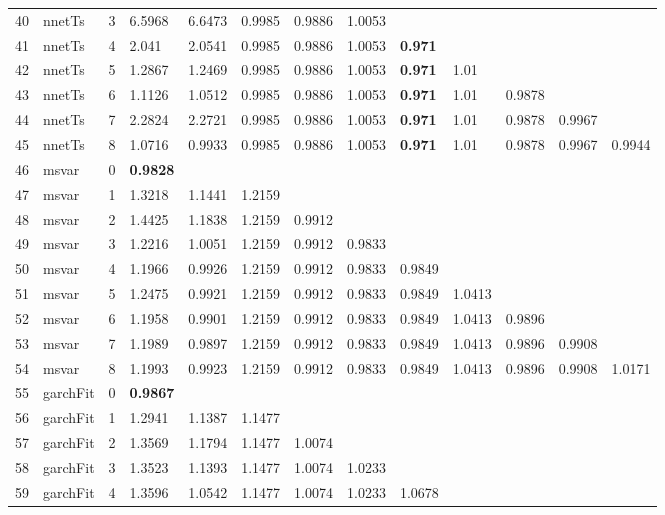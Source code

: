 \documentclass[10pt,a4paper]{article}
\begin{document}
\begin{table}[ht]
\begin{tabular}{rlrllllllllll}
  40 & nnetTs &     3 & 6.5968 & 6.6473 & 0.9985 & 0.9886 & 1.0053 &  &  &  &  &  \\ 
  41 & nnetTs &     4 & 2.041 & 2.0541 & 0.9985 & 0.9886 & 1.0053 & \textbf{0.971} &  &  &  &  \\ 
  42 & nnetTs &     5 & 1.2867 & 1.2469 & 0.9985 & 0.9886 & 1.0053 & \textbf{0.971} & 1.01 &  &  &  \\ 
  43 & nnetTs &     6 & 1.1126 & 1.0512 & 0.9985 & 0.9886 & 1.0053 & \textbf{0.971} & 1.01 & 0.9878 &  &  \\ 
  44 & nnetTs &     7 & 2.2824 & 2.2721 & 0.9985 & 0.9886 & 1.0053 & \textbf{0.971} & 1.01 & 0.9878 & 0.9967 &  \\ 
  45 & nnetTs &     8 & 1.0716 & 0.9933 & 0.9985 & 0.9886 & 1.0053 & \textbf{0.971} & 1.01 & 0.9878 & 0.9967 & 0.9944 \\ 
   \hline
46 & msvar &     0 & \textbf{0.9828} &  &  &  &  &  &  &  &  &  \\ 
  47 & msvar &     1 & 1.3218 & 1.1441 & 1.2159 &  &  &  &  &  &  &  \\ 
  48 & msvar &     2 & 1.4425 & 1.1838 & 1.2159 & 0.9912 &  &  &  &  &  &  \\ 
  49 & msvar &     3 & 1.2216 & 1.0051 & 1.2159 & 0.9912 & 0.9833 &  &  &  &  &  \\ 
  50 & msvar &     4 & 1.1966 & 0.9926 & 1.2159 & 0.9912 & 0.9833 & 0.9849 &  &  &  &  \\ 
  51 & msvar &     5 & 1.2475 & 0.9921 & 1.2159 & 0.9912 & 0.9833 & 0.9849 & 1.0413 &  &  &  \\ 
  52 & msvar &     6 & 1.1958 & 0.9901 & 1.2159 & 0.9912 & 0.9833 & 0.9849 & 1.0413 & 0.9896 &  &  \\ 
  53 & msvar &     7 & 1.1989 & 0.9897 & 1.2159 & 0.9912 & 0.9833 & 0.9849 & 1.0413 & 0.9896 & 0.9908 &  \\ 
  54 & msvar &     8 & 1.1993 & 0.9923 & 1.2159 & 0.9912 & 0.9833 & 0.9849 & 1.0413 & 0.9896 & 0.9908 & 1.0171 \\ 
   \hline
55 & garchFit &     0 & \textbf{0.9867} &  &  &  &  &  &  &  &  &  \\ 
  56 & garchFit &     1 & 1.2941 & 1.1387 & 1.1477 &  &  &  &  &  &  &  \\ 
  57 & garchFit &     2 & 1.3569 & 1.1794 & 1.1477 & 1.0074 &  &  &  &  &  &  \\ 
  58 & garchFit &     3 & 1.3523 & 1.1393 & 1.1477 & 1.0074 & 1.0233 &  &  &  &  &  \\ 
  59 & garchFit &     4 & 1.3596 & 1.0542 & 1.1477 & 1.0074 & 1.0233 & 1.0678 &  &  &  &  \\ 

\end{tabular}
\end{table}
\end{document}
